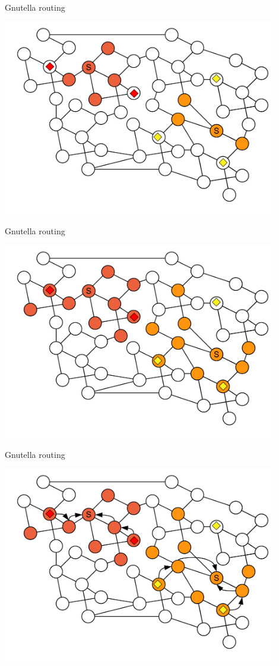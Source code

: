 \begin{frame}{Gnutella routing}
	
\includegraphics[width=0.9\textwidth]{figs/10/gnutella3}

\end{frame}

\begin{frame}{Gnutella routing}
	
\includegraphics[width=0.9\textwidth]{figs/10/gnutella4}

\end{frame}

\begin{frame}{Gnutella routing}
	
\includegraphics[width=0.9\textwidth]{figs/10/gnutella5}

\end{frame}

